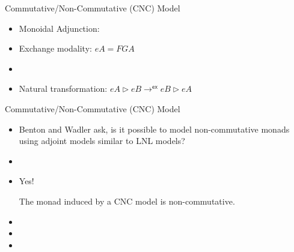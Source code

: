 \documentclass{beamer}
\let\mto\to
\let\to\relax
\begin{document}


\begin{frame}{Commutative/Non-Commutative (CNC) Model}

  \begin{itemize}
  \item Monoidal Adjunction:
    \begin{center}
    \end{center}
    
  \item Exchange modality: $eA = FGA$
  \item[]
  \item Natural transformation: $eA \rhd eB \mto^{\mathsf{ex}} eB \rhd eA$
  \end{itemize}

\end{frame}

\begin{frame}{Commutative/Non-Commutative (CNC) Model}

  \begin{itemize}
  \item Benton and Wadler ask, is it possible to model non-commutative
    monads using adjoint models similar to LNL models?
  \item[]
  \item Yes!
    \begin{lemma}
      \label{lemma:non-com-CNC}
      The monad induced by a CNC model is non-commutative.
    \end{lemma}
  \item[]
  \item[]
  \item[]
  \end{itemize}  
\end{frame}
\end{document}
